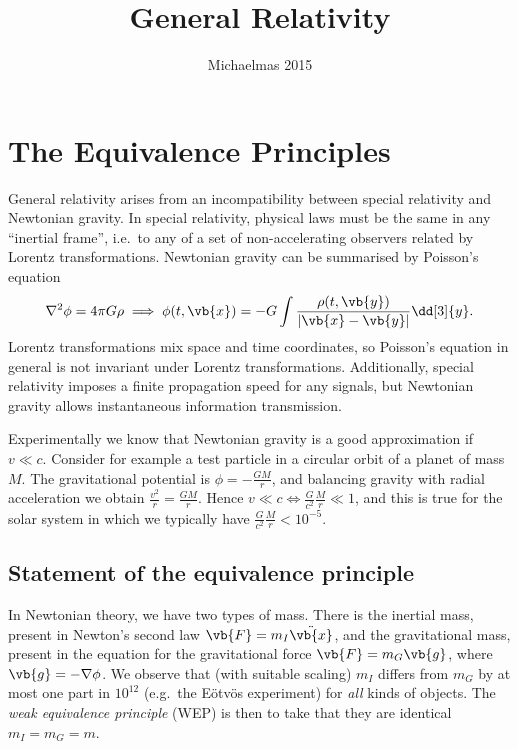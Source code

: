 \documentclass{jknotes}
\title{General Relativity}
\date{Michaelmas 2015}
\begin{document}
\maketitle
\suggestionsspiel

\tableofcontents

\section{The Equivalence Principles}
General relativity arises from an incompatibility between special relativity and Newtonian gravity. In special relativity, physical laws must be the same in any ``inertial frame'', i.e.\ to any of a set of non-accelerating observers related by Lorentz transformations. Newtonian gravity can be summarised by Poisson's equation
\begin{equation}
    \nabla^2\phi = 4\pi G\rho \implies \phi(t,\vb{x}) = -G \int\frac{\rho(t,\vb{y})}{|\vb{x}-\vb{y}|}\dd[3]{y}.
\end{equation}
Lorentz transformations mix space and time coordinates, so Poisson's equation in general is not invariant under Lorentz transformations. Additionally, special relativity imposes a finite propagation speed for any signals, but Newtonian gravity allows instantaneous information transmission.

Experimentally we know that Newtonian gravity is a good approximation if \(v\ll c\). Consider for example a test particle in a circular orbit of a planet of mass \(M\). The gravitational potential is \(\phi = -\frac{GM}{r}\), and balancing gravity with radial acceleration we obtain \(\frac{v^2}{r} = \frac{GM}{r}\). Hence \(v \ll c \iff \frac{G}{c^2}\frac{M}{r} \ll 1\), and this is true for the solar system in which we typically have \(\frac{G}{c^2}\frac{M}{r}< 10^{-5}\).
 
\subsection{Statement of the equivalence principle}
In Newtonian theory, we have two types of mass. There is the inertial mass, present in Newton's second law \(\vb{F}=m_I\ddot{\vb{x}}\), and the gravitational mass, present in the equation for the gravitational force \(\vb{F}=m_G\vb{g}\), where \(\vb{g}=-\nabla\phi\). We observe that (with suitable scaling) \(m_I\) differs from \(m_G\) by at most one part in \(10^{12}\) (e.g.\ the E\"otv\"os experiment) for \emph{all} kinds of objects. The \emph{weak equivalence principle} (WEP) is then to take that they are identical \(m_I=m_G=m\).
\end{document}
